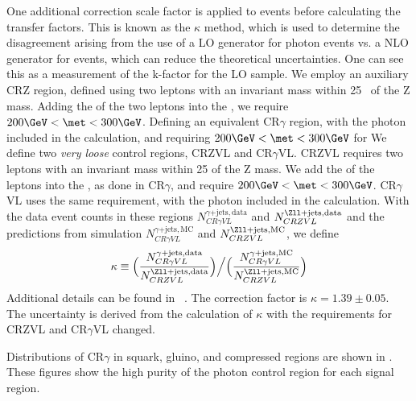 One additional correction scale factor is applied to \gammajets events before calculating the transfer factors.
This is known as the $\kappa$ method, which is used to determine the disagreement arising from the use of a LO generator for photon events vs. a NLO generator for \zjets events, which can reduce the theoretical uncertainties.
One can see this as a measurement of the k-factor for the LO \gammajets sample.
We employ an auxiliary CRZ region, defined using two leptons with an invariant mass within 25 \GeV~of the Z mass.
Adding the \pt of the two leptons into the \met, we require $200 \GeV < \met < 300 \GeV$.
Defining an equivalent CR$\gamma$ region, with the photon \pt included in the \met calculation, and requiring $200 \GeV < \met < 300 \GeV$ for
We define two \textit{very loose} control regions, CRZVL and CR$\gamma$VL.
CRZVL requires two leptons with an invariant mass within 25 \GeV of the Z mass.
We add the \pt of the leptons into the \met, as done in CR$\gamma$, and require $200 \GeV < \met < 300 \GeV$.
CR$\gamma$VL uses the same \met requirement, with the photon included in the \met calculation.
With the data event counts in these regions $N_{CR\gamma VL}^{\gamma\mathrm{+jets,data}}$ and $N_{CRZVL}^{\Zll\mathrm{+jets,data}}$ and the predictions from simulation $N_{CR\gamma VL}^{\gamma\mathrm{+jets,MC}}$ and $N_{CRZVL}^{\Zll\mathrm{+jets,MC}}$, we define
\begin{align}
\kappa \equiv \Big( \frac{N_{CR\gamma VL}^{\gamma\mathrm{+jets,data}}}{N_{CRZVL}^{\Zll\mathrm{+jets,data}}} \Big) \Big/ \Big( \frac{N_{CR\gamma VL}^{\gamma\mathrm{+jets,MC}}}{N_{CRZVL}^{\Zll\mathrm{+jets,MC}}} \Big)
\end{align}
Additional details can be found in ~\cite{0-leptonPaper,0LPaper_13TeV,ATLAS-CONF-2016-078}.
The correction factor is $\kappa = 1.39 \pm 0.05$.
The uncertainty is derived from the calculation of $\kappa$ with the \met requirements for CRZVL and CR$\gamma$VL changed.

Distributions of CR$\gamma$ in squark, gluino, and compressed regions are shown in .
These figures show the high purity of the photon control region for each signal region.

